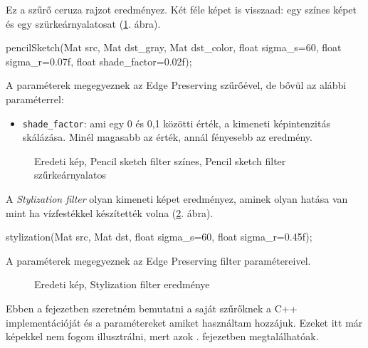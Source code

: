 
Ez a szűrő ceruza rajzot eredményez. Két féle képet is visszaad: egy színes képet és egy szürkeárnyalatosat (\ref{fig:pencil_sketch_color_grey}. ábra).
\begin{cpp}
pencilSketch(Mat src, Mat dst_gray, Mat dst_color, float sigma_s=60, 
             float sigma_r=0.07f, float shade_factor=0.02f);
\end{cpp}
A paraméterek megegyeznek az Edge Preserving szűrőével, de bővül az alábbi paraméterrel:
\begin{itemize}
    \item \texttt{shade\_factor}: ami egy 0 és 0,1 közötti érték, a kimeneti képintenzitás skálázása. Minél magasabb az érték, annál fényesebb az eredmény.
\end{itemize}

\begin{figure}[ht]
\centering
{}
\caption{Eredeti kép, Pencil sketch filter színes, Pencil sketch filter szűrkeárnyalatos} 
\label{fig:pencil_sketch_color_grey}
\end{figure}


A \textit{Stylization filter} olyan kimeneti képet eredményez, aminek olyan hatása van mint ha vízfestékkel készítették volna (\ref{fig:stylization}. ábra).
\begin{cpp}
stylization(Mat src, Mat dst, float sigma_s=60, float sigma_r=0.45f);
\end{cpp}
A paraméterek megegyeznek az Edge Preserving filter paramétereivel. 

\begin{figure}[ht]
\centering
{}
\caption{Eredeti kép, Stylization filter eredménye} 
\label{fig:stylization}
\end{figure}



Ebben a fejezetben szeretném bemutatni a saját szűrőknek a C++ implementációját és a paramétereket amiket használtam hozzájuk. Ezeket itt már képekkel nem fogom illusztrálni, mert azok . fejezetben megtalálhatóak.


